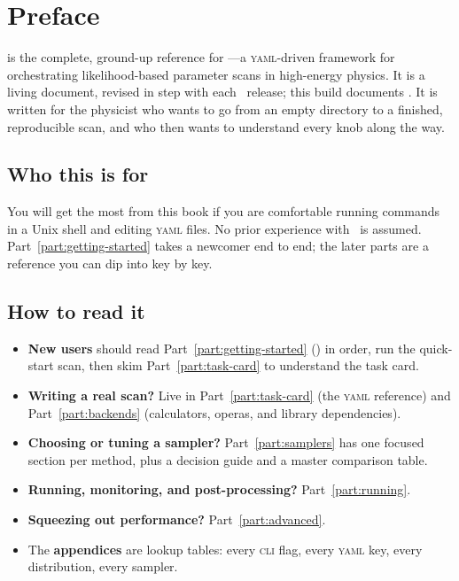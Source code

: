 \chapter*{Preface}

 is the complete, ground-up reference for \Jarvis---a
\textsc{yaml}-driven framework for orchestrating likelihood-based parameter scans in
high-energy physics. It is a living document, revised in step with each \Jarvis\ release;
this build documents \Jversion. It is written for the physicist who wants to go from an empty
directory to a finished, reproducible scan, and who then wants to understand every knob
along the way.

\section*{Who this is for}

You will get the most from this book if you are comfortable running commands in a Unix
shell and editing \textsc{yaml} files. No prior experience with \Jarvis\ is assumed.
Part~\ref{part:getting-started} takes a newcomer end to end; the later parts are a
reference you can dip into key by key.

\section*{How to read it}

\begin{itemize}
  \item \textbf{New users} should read Part~\ref{part:getting-started}
        () in order, run the quick-start scan, then skim
        Part~\ref{part:task-card} to understand the task card.
  \item \textbf{Writing a real scan?} Live in Part~\ref{part:task-card}
        (the \textsc{yaml} reference) and Part~\ref{part:backends} (calculators, operas,
        and library dependencies).
  \item \textbf{Choosing or tuning a sampler?} Part~\ref{part:samplers} has one focused
        section per method, plus a decision guide and a master comparison table.
  \item \textbf{Running, monitoring, and post-processing?} Part~\ref{part:running}.
  \item \textbf{Squeezing out performance?} Part~\ref{part:advanced}.
  \item The \textbf{appendices} are lookup tables: every \textsc{cli} flag, every
        \textsc{yaml} key, every distribution, every sampler.
\end{itemize}

